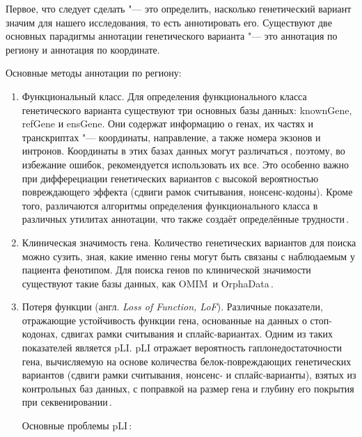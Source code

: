 \documentclass[a4paper,14pt]{extarticle}
\newcommand{\ecitep}[1]{\textenglish{\citep{#1}}}
\newcommand{\engterm}[1]{англ. \textenglish{\textit{#1}}}
\begin{document}
Первое, что следует сделать "--- это определить, насколько генетический вариант значим для нашего исследования, то есть аннотировать его.
Существуют две основных парадигмы аннотации генетического варианта "--- это аннотация по региону и аннотация по координате.

Основные методы аннотации по региону:

\begin{enumerate}
	\item Функциональный класс.
	 Для определения функционального класса генетического варианта существуют три основных базы данных: knownGe\-ne, refGene и ensGene.
	 Они содержат информацию о генах, их частях и транскриптах "--- координаты, направление, а также номера экзонов и интронов.
	 Координаты в этих базах данных могут различаться\,\ecitep{McCarthy_2014}, поэтому, во избежание ошибок, рекомендуется использовать их все.
	 Это особенно важно при дифферециации генетических вариантов с высокой вероятностью повреждающего эффекта (сдвиги рамок считывания, нонсенс-кодоны).
	 Кроме того, различаются алгоритмы определения функционального класса в различных утилитах аннотации, что также создаёт определённые трудности\,\ecitep{Jesaitis_2014}.

	\item Клиническая значимость гена.
	 Количество генетических вариантов для поиска можно сузить, зная, какие именно гены могут быть связаны с наблюдаемым у пациента фенотипом.
	 Для поиска генов по клинической значимости существуют такие базы данных, как OMIM\,\ecitep{Amberger_2014} и OrphaData\,\ecitep{Orphanet}.

	\item Потеря функции (\engterm{Loss of Function, LoF}).
	 Различные показатели, отражающие устойчивость функции гена, основанные на данных о стоп-кодонах, сдвигах рамки считывания и сплайс-вариантах.
	 Одним из таких показателей является pLI.
	 pLI отражает вероятность гаплонедостаточности гена, вычисляемую на основе количества белок\hyp{}повреждающих генетических вариантов (сдвиги рамки считывания, нонсенс- и сплайс\hyp{}варианты), взятых из контрольных баз данных, с поправкой на размер гена и глубину его покрытия при секвенировании\,\ecitep{Ziegler_2019}.

	 Основные проблемы pLI\,\ecitep{Ziegler_2019}:


\end{enumerate}
\end{document}
